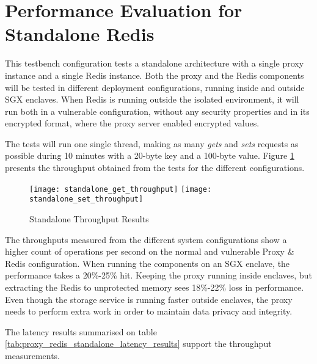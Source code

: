 \section{Performance Evaluation for Standalone Redis}
\label{sec:performance_evaluation_standalone_redis}

This testbench configuration tests a standalone architecture with a single proxy instance and a single Redis instance. Both the proxy and the Redis components will be tested in different deployment configurations, running inside and outside \gls{SGX} enclaves. When Redis is running outside the isolated environment, it will run both in a vulnerable configuration, without any security properties and in its encrypted format, where the proxy server enabled encrypted values.

The tests will run one single thread, making as many \textit{gets} and \textit{sets} requests as possible during 10 minutes with a 20-byte key and a 100-byte value. Figure \ref{fig:standalone_throughput_results} presents the throughput obtained from the tests for the different configurations.

\begin{figure}[htbp]
  \centering
  \hspace*{-7mm}
    {\texttt{[image: standalone\_get\_throughput]}}%
    {\texttt{[image: standalone\_set\_throughput]}}%
  \caption{Standalone Throughput Results}
  \label{fig:standalone_throughput_results}
\end{figure}

The throughputs measured from the different system configurations show a higher count of operations per second on the normal and vulnerable Proxy \& Redis configuration. When running the components on an \gls{SGX} enclave, the performance takes a 20\%-25\% hit. Keeping the proxy running inside enclaves, but extracting the Redis to unprotected memory sees 18\%-22\% loss in performance. Even though the storage service is running faster outside enclaves, the proxy needs to perform extra work in order to maintain data privacy and integrity.
 
The latency results summarised on table \ref{tab:proxy_redis_standalone_latency_results} support the throughput measurements.

